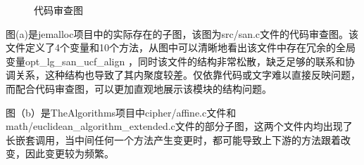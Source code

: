 \begin{figure}[!h]
    \setlength{\subfigcapskip}{-1bp}
    \centering
    \begin{minipage}{\textwidth}
    \centering
    \hspace{2em}
    \end{minipage}
    \centering
    \begin{minipage}{\textwidth}
    \centering
    \hspace{2em}
    \end{minipage}
    \vspace{0.2em}
    \caption{代码审查图} %
\end{figure}


图(a)是jemalloc项目中的实际存在的子图，该图为src/san.c文件的代码审查图。该文件定义了4个变量和10个方法，从图中可以清晰地看出该文件中存在冗余的全局变量opt\_lg\_san\_ucf\_align ，同时该文件的结构非常松散，缺乏足够的联系和协调关系，这种结构也导致了其内聚度较差。仅依靠代码或文字难以直接反映问题，而配合代码审查图，可以更加直观地展示该模块的结构问题。

图（b）是TheAlgorithms项目中cipher/affine.c文件和math/euclidean\_algorithm\_extended.c文件的部分子图，这两个文件内均出现了长嵌套调用，当中间任何一个方法产生变更时，都可能导致上下游的方法跟着改变，因此变更较为频繁。

